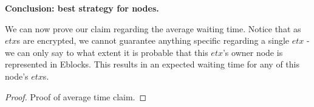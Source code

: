 \textbf{Conclusion: best strategy for nodes.}  


We can now prove our claim regarding the average waiting time. Notice that as $etx$s are encrypted, we cannot guarantee anything specific regarding a single $etx$ - we can only say to what extent it is probable that this $etx$'s owner node is represented in Eblocks. This results in an expected waiting time for any of this node's $etx$s. 
\begin{proof}
	Proof of average time claim.
\end{proof} 